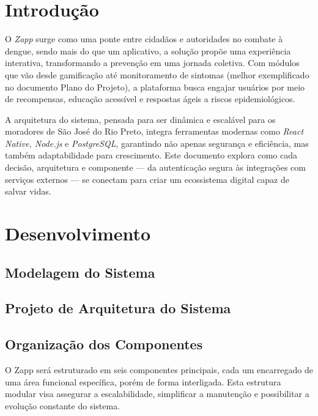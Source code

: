 \documentclass[a4paper, 12pt]{article}
\begin{document}


\newpage
\section{Introdução}

O \textit{Zapp} surge como uma ponte entre cidadãos e autoridades no combate à dengue, sendo mais do que um aplicativo, a solução propõe uma experiência interativa, transformando a prevenção em uma jornada coletiva. Com módulos que vão desde gamificação até monitoramento de sintomas (melhor exemplificado no documento Plano do Projeto), a plataforma busca engajar usuários por meio de recompensas, educação acessível e respostas ágeis a riscos epidemiológicos.

A arquitetura do sistema, pensada para ser dinâmica e escalável para os moradores de São José do Rio Preto, integra ferramentas modernas como \textit{React Native, Node.js} e \textit{PostgreSQL}, garantindo não apenas segurança e eficiência, mas também adaptabilidade para crescimento. Este documento explora como cada decisão, arquitetura e componente — da autenticação segura às integrações com serviços externos — se conectam para criar um ecossistema digital capaz de salvar vidas.

\newpage
\section{Desenvolvimento}

\subsection{Modelagem do Sistema}

\subsection{Projeto de Arquitetura do Sistema}

\subsection{Organização dos Componentes}

O Zapp será estruturado em seis componentes principais, cada um encarregado de uma área funcional específica, porém de forma interligada.  Esta estrutura modular visa assegurar a escalabilidade, simplificar a manutenção e possibilitar a evolução constante do sistema.
\end{document}
